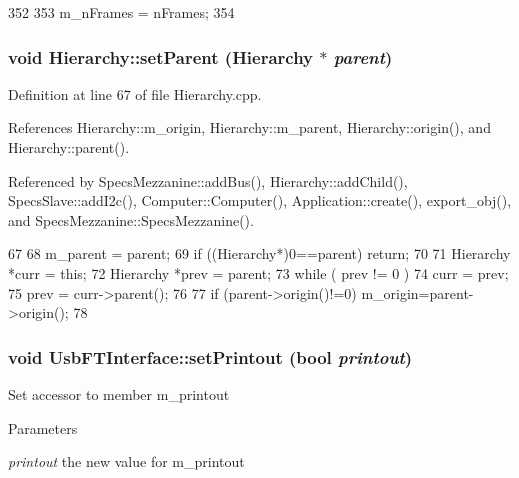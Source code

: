 \begin{DoxyCode}
352                                      {
353     m_nFrames = nFrames;
354   }
\end{DoxyCode}
\hypertarget{classHierarchy_a585ad1aeec16077a0e532ab8b4fc557b}{
\subsubsection[{setParent}]{\setlength{\rightskip}{0pt plus 5cm}void Hierarchy::setParent ({\bf Hierarchy} $\ast$ {\em parent})}}
\label{classHierarchy_a585ad1aeec16077a0e532ab8b4fc557b}


Definition at line 67 of file Hierarchy.cpp.

References Hierarchy::m\_\-origin, Hierarchy::m\_\-parent, Hierarchy::origin(), and Hierarchy::parent().

Referenced by SpecsMezzanine::addBus(), Hierarchy::addChild(), SpecsSlave::addI2c(), Computer::Computer(), Application::create(), export\_\-obj(), and SpecsMezzanine::SpecsMezzanine().


\begin{DoxyCode}
67                                               {
68   m_parent = parent;
69   if ((Hierarchy*)0==parent) return;
70 
71   Hierarchy *curr = this;
72   Hierarchy *prev = parent;
73   while ( prev != 0 ){
74     curr = prev;
75     prev = curr->parent();
76   }
77   if (parent->origin()!=0) m_origin=parent->origin();
78 }
\end{DoxyCode}
\hypertarget{classUsbFTInterface_a6f31debb1d94a65deb3acb72e3608f27}{
\subsubsection[{setPrintout}]{\setlength{\rightskip}{0pt plus 5cm}void UsbFTInterface::setPrintout (bool {\em printout})}}
\label{classUsbFTInterface_a6f31debb1d94a65deb3acb72e3608f27}
Set accessor to member m\_\-printout 
\begin{DoxyParams}{Parameters}
\item[{\em printout}]the new value for m\_\-printout \end{DoxyParams}


